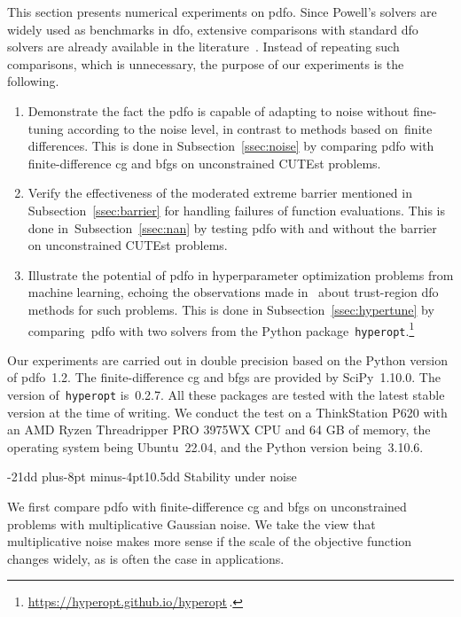 \documentclass[
    smallextended,  %
    final,          %
]{svjour3}
\makeatletter
\def\subsection{\@startsection{subsection}{2}{\z@}%
    {-21dd plus-8pt minus-4pt}{10.5dd}
     {\normalsize\bfseries}}
\makeatother
\begin{document}
This section presents numerical experiments on \gls{pdfo}.
Since Powell's solvers are widely used as benchmarks in \gls{dfo},
extensive comparisons with standard \gls{dfo} solvers are
already available in the literature~\cite{More_Wild_2009,Rios_Sahinidis_2013}.
Instead of repeating such comparisons, which is unnecessary,
the purpose of our experiments is the following.
\begin{enumerate}
    \item Demonstrate the fact the \gls{pdfo} is capable of adapting to noise without fine-tuning
        according to the noise level, in contrast to methods based on~finite differences.
        This is done in Subsection~\ref{ssec:noise} by comparing \gls{pdfo} with finite-difference
        \gls{cg} and \gls{bfgs} on unconstrained CUTEst problems.
    \item Verify the effectiveness of the moderated extreme barrier mentioned in
        Subsection~\ref{ssec:barrier} for handling failures of function
        evaluations. This is done in~Subsection~\ref{ssec:nan} by testing \gls{pdfo} with and
        without the barrier on unconstrained CUTEst problems.
    \item Illustrate the potential of \gls{pdfo} in hyperparameter optimization problems from
        machine learning, echoing the observations made in~\cite{Ghanbari_Scheinberg_2017} about
        trust-region \gls{dfo} methods for such problems.
        This is done in Subsection~\ref{ssec:hypertune} by comparing~\gls{pdfo} with two solvers
        from the Python package~\texttt{hyperopt}.\footnote{\url{https://hyperopt.github.io/hyperopt}\,.}
\end{enumerate}

Our experiments are carried out in double precision based on the Python version of \gls{pdfo}~1.2.
The finite-difference \gls{cg} and \gls{bfgs} are provided by SciPy~1.10.0.
The version of~\texttt{hyperopt} is~0.2.7. All these packages are tested with the latest stable version
at the time of writing.
We conduct the test on a ThinkStation P620 with an AMD Ryzen Threadripper
PRO 3975WX CPU and 64 GB of memory, the operating system being Ubuntu~22.04, and the Python version
being~3.10.6.


\subsection{Stability under noise}
\label{ssec:noise}

We first compare \gls{pdfo} with finite-difference \gls{cg} and \gls{bfgs} on unconstrained
problems with multiplicative Gaussian noise.
We take the view that multiplicative noise makes more sense if the scale of the objective
function changes widely, as is often the case in applications.
\end{document}
